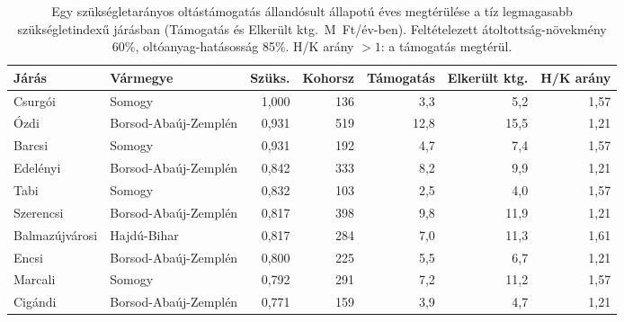 \begin{table}[htbp]
\centering
\small
\begin{tabular}{llrrrrr}
\toprule
Járás & Vármegye & Szüks. & Kohorsz & Támogatás & Elkerült ktg. & H/K arány \\
\midrule
Csurgói & Somogy & 1{,}000 & 136 & 3{,}3 & 5{,}2 & 1{,}57 \\
Ózdi & Borsod-Abaúj-Zemplén & 0{,}931 & 519 & 12{,}8 & 15{,}5 & 1{,}21 \\
Barcsi & Somogy & 0{,}931 & 192 & 4{,}7 & 7{,}4 & 1{,}57 \\
Edelényi & Borsod-Abaúj-Zemplén & 0{,}842 & 333 & 8{,}2 & 9{,}9 & 1{,}21 \\
Tabi & Somogy & 0{,}832 & 103 & 2{,}5 & 4{,}0 & 1{,}57 \\
Szerencsi & Borsod-Abaúj-Zemplén & 0{,}817 & 398 & 9{,}8 & 11{,}9 & 1{,}21 \\
Balmazújvárosi & Hajdú-Bihar & 0{,}817 & 284 & 7{,}0 & 11{,}3 & 1{,}61 \\
Encsi & Borsod-Abaúj-Zemplén & 0{,}800 & 225 & 5{,}5 & 6{,}7 & 1{,}21 \\
Marcali & Somogy & 0{,}792 & 291 & 7{,}2 & 11{,}2 & 1{,}57 \\
Cigándi & Borsod-Abaúj-Zemplén & 0{,}771 & 159 & 3{,}9 & 4{,}7 & 1{,}21 \\
\bottomrule
\end{tabular}
\caption{Egy szükségletarányos oltástámogatás állandósult állapotú éves megtérülése a tíz legmagasabb szükségletindexű járásban (Támogatás és Elkerült ktg.\ M~Ft/év-ben). Feltételezett átoltottság-növekmény 60\%, oltóanyag-hatásosság 85\%. H/K arány $>1$: a támogatás megtérül.}
\label{tab:costeff}
\end{table}
